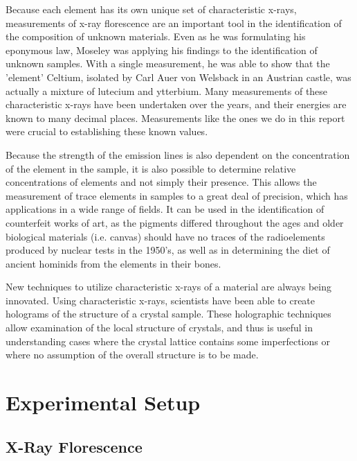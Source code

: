 \documentclass[%
 reprint,
 amsmath,amssymb,
 aps,
 pra,
]{revtex4-1}
\begin{document}
Because each element has its own unique set of characteristic x-rays, measurements of x-ray florescence are an important tool in the identification of the composition of unknown materials. Even as he was formulating his eponymous law, Moseley was applying his findings to the identification of unknown samples. With a single measurement, he was able to show that the 'element' Celtium, isolated by Carl Auer von Welsback in an Austrian castle, was actually a mixture of lutecium and ytterbium\cite{xray_history}. Many measurements of these characteristic x-rays have been undertaken over the years, and their energies are known to many decimal places\cite{database1, database2}. Measurements like the ones we do in this report were crucial to establishing these known values.

Because the strength of the emission lines is also dependent on the concentration of the element in the sample\cite{miller}, it is also possible to determine relative concentrations of elements and not simply their presence. This allows the measurement of trace elements in samples to a great deal of precision, which has applications in a wide range of fields. It can be used in the identification of counterfeit works of art\cite{art1, art2, art3}, as the pigments differed throughout the ages and older biological materials (i.e. canvas) should have no traces of the radioelements produced by nuclear tests in the 1950's, as well as in determining the diet of ancient hominids from the elements in their bones\cite{art3, arch1, arch2, traces}.

New techniques to utilize characteristic x-rays of a material are always being innovated. Using characteristic x-rays, scientists have been able to create holograms of the structure of a crystal sample\cite{hologram, hologram2}. These holographic techniques allow examination of the local structure of crystals, and thus is useful in understanding cases where the crystal lattice contains some imperfections or where no assumption of the overall structure is to be made. 


\section{Experimental Setup}

\subsection{X-Ray Florescence}
\end{document}
